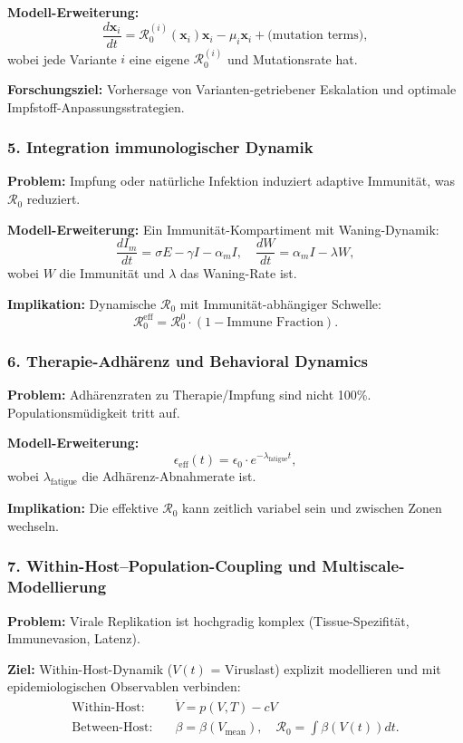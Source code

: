 ﻿\documentclass[a4paper,12pt,twoside]{article}
\theoremstyle{definition}
\begin{document}
\textbf{Modell-Erweiterung:}
\[
\frac{d \mathbf{x}_i}{dt} = \mathcal{R}_0^{(i)} (\mathbf{x}_i) \mathbf{x}_i - \mu_i \mathbf{x}_i + \text{(mutation terms)},
\]
wobei jede Variante $i$ eine eigene $\mathcal{R}_0^{(i)}$ und Mutationsrate hat.

\textbf{Forschungsziel:} Vorhersage von Varianten-getriebener Eskalation und optimale Impfstoff-Anpassungsstrategien.

\subsubsection{5. Integration immunologischer Dynamik}

\textbf{Problem:} Impfung oder natürliche Infektion induziert adaptive Immunität, was $\mathcal{R}_0$ reduziert.

\textbf{Modell-Erweiterung:} Ein Immunität-Kompartiment mit Waning-Dynamik:
\[
\frac{dI_m}{dt} = \sigma E - \gamma I - \alpha_m I, \quad \frac{dW}{dt} = \alpha_m I - \lambda W,
\]
wobei $W$ die Immunität und $\lambda$ das Waning-Rate ist.

\textbf{Implikation:} Dynamische $\mathcal{R}_0$ mit Immunität-abhängiger Schwelle:
\[
\mathcal{R}_0^{\text{eff}} = \mathcal{R}_0^0 \cdot (1 - \text{Immune Fraction}).
\]

\subsubsection{6. Therapie-Adhärenz und Behavioral Dynamics}

\textbf{Problem:} Adhärenzraten zu Therapie/Impfung sind nicht 100\%. Populationsmüdigkeit tritt auf.

\textbf{Modell-Erweiterung:}
\[
\epsilon_{\text{eff}}(t) = \epsilon_0 \cdot e^{-\lambda_{\text{fatigue}} t},
\]
wobei $\lambda_{\text{fatigue}}$ die Adhärenz-Abnahmerate ist.

\textbf{Implikation:} Die effektive $\mathcal{R}_0$ kann zeitlich variabel sein und zwischen Zonen wechseln.

\subsubsection{7. Within-Host--Population-Coupling und Multiscale-Modellierung}

\textbf{Problem:} Virale Replikation ist hochgradig komplex (Tissue-Spezifität, Immunevasion, Latenz).

\textbf{Ziel:} Within-Host-Dynamik ($V(t)$ = Viruslast) explizit modellieren und mit epidemiologischen Observablen verbinden:
\begin{align}
\text{Within-Host:} \quad & \dot{V} = p(V, T) - c V \\
\text{Between-Host:} \quad & \beta = \beta(V_{\text{mean}}), \quad \mathcal{R}_0 = \int \beta(V(t)) dt.
\end{align}
\end{document}
